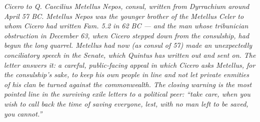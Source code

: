 
\textit{Cicero to Q. Caecilius Metellus Nepos, consul, written
from Dyrrachium around April 57 BC. Metellus Nepos was the
younger brother of the Metellus Celer to whom Cicero had
written \textit{Fam.} 5.2 in 62 BC --- and the man whose
tribunician obstruction in December 63, when Cicero stepped
down from the consulship, had begun the long quarrel. Metellus
had now (as consul of 57) made an unexpectedly conciliatory
speech in the Senate, which Quintus has written out and sent
on. The letter answers it: a careful, public-facing appeal in
which Cicero asks Metellus, for the consulship's sake, to keep
his own people in line and not let private enmities of his
clan be turned against the commonwealth. The closing warning
is the most pointed line in the surviving exile letters to a
political peer: ``take care, when you wish to call back the
time of saving everyone, lest, with no man left to be saved,
you cannot.''}
